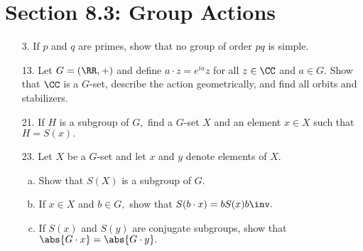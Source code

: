 \documentclass{article}
\begin{document}
\section*{Section 8.3: Group Actions}

\begin{itemize}
	\item[3.] If $p$ and $q$ are primes, show that no group of order $pq$ is simple.

	\item[13.] Let $G=\left( \RR, + \right)$ and define $a\cdot z=e^{ia}z$ for all $z\in\CC$ and $a\in G.$ Show that $\CC$ is a $G$-set, describe the action geometrically, and find all orbits and stabilizers.

	\item[21.] If $H$ is a subgroup of $G,$ find a $G$-set $X$ and an element $x\in X$ such that $H=S(x).$

	\item[23.] Let $X$ be a $G$-set and let $x$ and $y$ denote elements of $X.$
		\begin{enumerate}[(a)]
			\item Show that $S(X)$ is a subgroup of $G.$

			\item If $x\in X$ and $b\in G,$ show that $S(b\cdot x)=bS(x)b\inv.$

			\item If $S(x)$ and $S(y)$ are conjugate subgroups, show that $\abs{G\cdot x}=\abs{G\cdot y}.$
				
		\end{enumerate}
		
\end{itemize}
\end{document}
